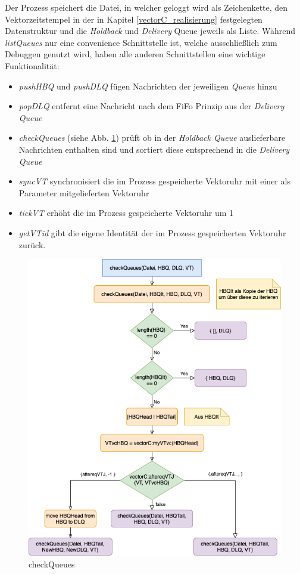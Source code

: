 Der Prozess speichert die Datei, in welcher geloggt wird als Zeichenkette, den Vektorzeitstempel in der in Kapitel \ref{vectorC_realisierung} festgelegten Datenstruktur und die \textit{Holdback} und \textit{Delivery} Queue jeweils als Liste. Während \textit{listQueues} nur eine convenience Schnittstelle ist, welche ausschließlich zum Debuggen genutzt wird, haben alle anderen Schnittstellen eine wichtige Funktionalität: 
\begin{itemize}
    \item \textit{pushHBQ} und \textit{pushDLQ} fügen Nachrichten der jeweiligen \textit{Queue} hinzu
    \item \textit{popDLQ} entfernt eine Nachricht nach dem FiFo Prinzip aus der \textit{Delivery Queue}
    \item \textit{checkQueues} (siehe Abb. \ref{fig:flow_checkQueues}) prüft ob in der \textit{Holdback Queue} auslieferbare Nachrichten enthalten sind und sortiert diese entsprechend in die \textit{Delivery Queue}
    \item \textit{syncVT} synchronisiert die im Prozess gespeicherte Vektoruhr mit einer als Parameter mitgelieferten Vektoruhr
    \item \textit{tickVT} erhöht die im Prozess gespeicherte Vektoruhr um 1
    \item \textit{getVTid} gibt die eigene Identität der im Prozess gespeicherten Vektoruhr zurück. 
\end{itemize}

\begin{figure}[htbp]
\begin{center}
\includegraphics[scale=0.6]{Latex/Bilder/checkQueues.png}
\caption{\label{fig:flow_checkQueues} checkQueues}
\end{center}
\end{figure}
    
